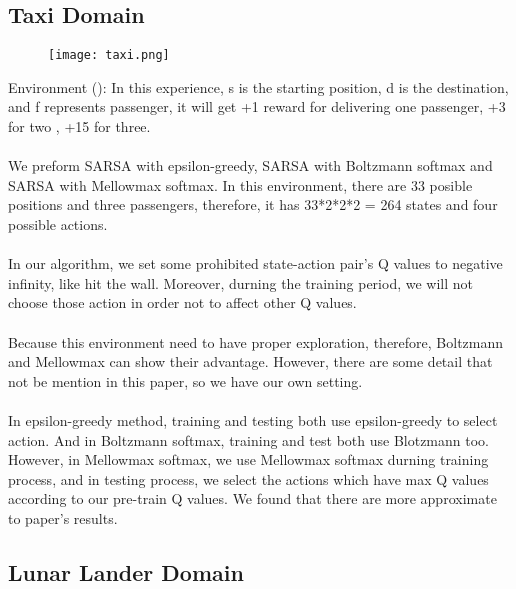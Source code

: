 \subsection{Taxi Domain}

\begin{figure}[H]
\texttt{[image: taxi.png]}
\end{figure}

Environment (\cite{dearden1998bayesian}):
In this experience, s is the starting position, d is the destination, and f represents passenger, it will get +1 reward for delivering one passenger, +3 for two , +15 for three.
\\
\\
We preform SARSA with epsilon-greedy, SARSA with Boltzmann softmax and SARSA with Mellowmax softmax. In this environment, there are 33 posible positions and three passengers, therefore, it has 33*2*2*2 = 264 states and four possible actions.
\\
\\
In our algorithm, we set some prohibited state-action pair's Q values to negative infinity, like hit the wall. Moreover, durning the training period, we will not choose those action in order not to affect other Q values.
\\
\\
Because this environment need to have proper exploration, therefore, Boltzmann and Mellowmax can show their advantage. However, there are some detail that not be mention in this paper, so we have our own setting.
\\
\\
In epsilon-greedy method, training and testing both use epsilon-greedy to select action. And in Boltzmann softmax, training and test both use Blotzmann too. However, in Mellowmax softmax, we use Mellowmax softmax durning training process, and in testing process, we select the actions which have max Q values according to our pre-train Q values. We found that there are more approximate to paper's results.

\subsection{Lunar Lander Domain}
